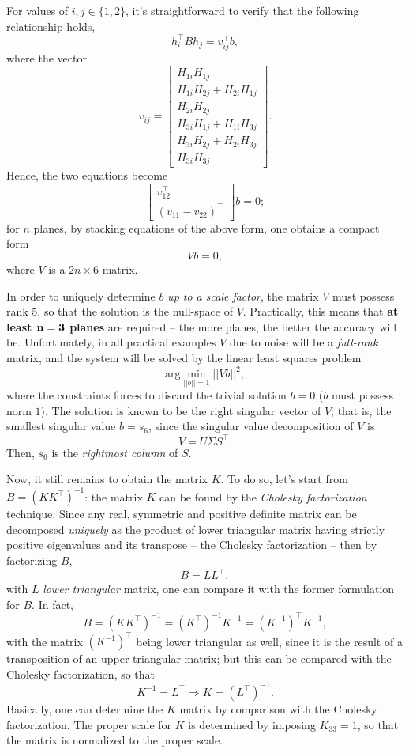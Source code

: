 \documentclass[10pt]{report}
\begin{document}
For values of \(i,j \in \{1,2\}\), it's straightforward to verify that the following relationship holds, $$h_i^\top B h_j = v_{ij}^\top b,$$ where the vector $$v_{ij} = \begin{bmatrix} H_{1i}H_{1j} \\ H_{1i}H_{2j} + H_{2i}H_{1j} \\ H_{2i}H_{2j} \\ H_{3i}H_{1j} + H_{1i}H_{3j} \\ H_{3i}H_{2j} + H_{2i}H_{3j} \\ H_{3i}H_{3j} \end{bmatrix}.$$ Hence, the two equations become $$\begin{bmatrix} v_{12}^\top \\ (v_{11} - v_{22})^\top \end{bmatrix} b = 0;$$ for \(n\) planes, by stacking equations of the above form, one obtains a compact form $$Vb = 0,$$ where \(V\) is a \(2n \times 6\) matrix.

In order to uniquely determine \(b\) \emph{up to a scale factor}, the matrix \(V\) must possess rank \(5\), so that the solution is the null\--space of \(V\). Practically, this means that \textbf{at least \(\bf{n = 3}\) planes} are required -- the more planes, the better the accuracy will be. Unfortunately, in all practical examples \(V\) due to noise will be a \emph{full\--rank} matrix, and the system will be solved by the linear least squares problem $$\mbox{arg}\min_{||b||=1} ||Vb||^2,$$ where the constraints forces to discard the trivial solution \(b=0\) (\(b\) must possess norm \(1\)). The solution is known to be the right singular vector of \(V\); that is, the smallest singular value \(b = s_6\), since the singular value decomposition of \(V\) is $$V = U\Sigma S^\top.$$ Then, \(s_6\) is the \emph{rightmost column} of \(S\).

Now, it still remains to obtain the matrix \(K\). To do so, let's start from \(B = (KK^\top)^{-1}\): the matrix \(K\) can be found by the \emph{Cholesky factorization} technique. Since any real, symmetric and positive definite matrix can be decomposed \emph{uniquely} as the product of lower triangular matrix having strictly positive eigenvalues and its transpose -- the Cholesky factorization -- then by factorizing \(B\), $$B = LL^\top,$$ with \(L\) \emph{lower triangular} matrix, one can compare it with the former formulation for \(B\). In fact, $$B = (KK^\top)^{-1} = (K^\top)^{-1}K^{-1} = (K^{-1})^\top K^{-1},$$ with the matrix \((K^{-1})^\top\) being lower triangular as well, since it is the result of a transposition of an upper triangular matrix; but this can be compared with the Cholesky factorization, so that $$K^{-1} = L^\top \Longrightarrow K = (L^\top)^{-1}.$$ Basically, one can determine the \(K\) matrix by comparison with the Cholesky factorization. The proper scale for \(K\) is determined by imposing \(K_{33} = 1\), so that the matrix is normalized to the proper scale.
\end{document}
